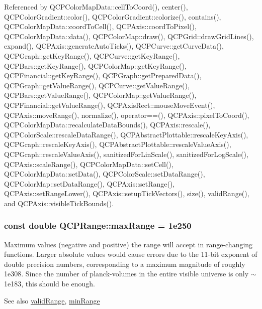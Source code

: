 Referenced by Q\+C\+P\+Color\+Map\+Data\+::cell\+To\+Coord(), center(), Q\+C\+P\+Color\+Gradient\+::color(), Q\+C\+P\+Color\+Gradient\+::colorize(), contains(), Q\+C\+P\+Color\+Map\+Data\+::coord\+To\+Cell(), Q\+C\+P\+Axis\+::coord\+To\+Pixel(), Q\+C\+P\+Color\+Map\+Data\+::data(), Q\+C\+P\+Color\+Map\+::draw(), Q\+C\+P\+Grid\+::draw\+Grid\+Lines(), expand(), Q\+C\+P\+Axis\+::generate\+Auto\+Ticks(), Q\+C\+P\+Curve\+::get\+Curve\+Data(), Q\+C\+P\+Graph\+::get\+Key\+Range(), Q\+C\+P\+Curve\+::get\+Key\+Range(), Q\+C\+P\+Bars\+::get\+Key\+Range(), Q\+C\+P\+Color\+Map\+::get\+Key\+Range(), Q\+C\+P\+Financial\+::get\+Key\+Range(), Q\+C\+P\+Graph\+::get\+Prepared\+Data(), Q\+C\+P\+Graph\+::get\+Value\+Range(), Q\+C\+P\+Curve\+::get\+Value\+Range(), Q\+C\+P\+Bars\+::get\+Value\+Range(), Q\+C\+P\+Color\+Map\+::get\+Value\+Range(), Q\+C\+P\+Financial\+::get\+Value\+Range(), Q\+C\+P\+Axis\+Rect\+::mouse\+Move\+Event(), Q\+C\+P\+Axis\+::move\+Range(), normalize(), operator==(), Q\+C\+P\+Axis\+::pixel\+To\+Coord(), Q\+C\+P\+Color\+Map\+Data\+::recalculate\+Data\+Bounds(), Q\+C\+P\+Axis\+::rescale(), Q\+C\+P\+Color\+Scale\+::rescale\+Data\+Range(), Q\+C\+P\+Abstract\+Plottable\+::rescale\+Key\+Axis(), Q\+C\+P\+Graph\+::rescale\+Key\+Axis(), Q\+C\+P\+Abstract\+Plottable\+::rescale\+Value\+Axis(), Q\+C\+P\+Graph\+::rescale\+Value\+Axis(), sanitized\+For\+Lin\+Scale(), sanitized\+For\+Log\+Scale(), Q\+C\+P\+Axis\+::scale\+Range(), Q\+C\+P\+Color\+Map\+Data\+::set\+Cell(), Q\+C\+P\+Color\+Map\+Data\+::set\+Data(), Q\+C\+P\+Color\+Scale\+::set\+Data\+Range(), Q\+C\+P\+Color\+Map\+::set\+Data\+Range(), Q\+C\+P\+Axis\+::set\+Range(), Q\+C\+P\+Axis\+::set\+Range\+Lower(), Q\+C\+P\+Axis\+::setup\+Tick\+Vectors(), size(), valid\+Range(), and Q\+C\+P\+Axis\+::visible\+Tick\+Bounds().

\hypertarget{class_q_c_p_range_a5ca51e7a2dc5dc0d49527ab171fe1f4f}{}
\subsubsection[{max\+Range}]{\setlength{\rightskip}{0pt plus 5cm}const double Q\+C\+P\+Range\+::max\+Range = 1e250\hspace{0.3cm}{\ttfamily [static]}}\label{class_q_c_p_range_a5ca51e7a2dc5dc0d49527ab171fe1f4f}
Maximum values (negative and positive) the range will accept in range-\/changing functions. Larger absolute values would cause errors due to the 11-\/bit exponent of double precision numbers, corresponding to a maximum magnitude of roughly 1e308. Since the number of planck-\/volumes in the entire visible universe is only $\sim$1e183, this should be enough. \begin{DoxySeeAlso}{See also}
\hyperlink{class_q_c_p_range_ab38bd4841c77c7bb86c9eea0f142dcc0}{valid\+Range}, \hyperlink{class_q_c_p_range_ab46d3bc95030ee25efda41b89e2b616b}{min\+Range} 
\end{DoxySeeAlso}


